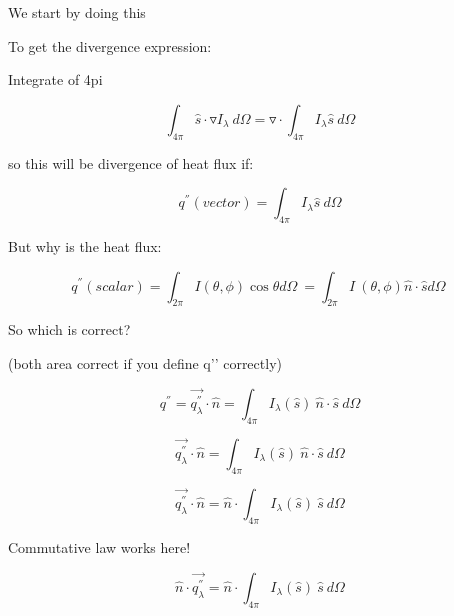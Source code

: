 \documentclass[12pt]{article}
\renewcommand{\_}{\kern-1.5pt\textunderscore\kern-1.5pt}
\begin{document}
We start by doing this\par

\par

To get the divergence expression:\par

\par

Integrate of 4pi\par

 \[  \int _{4 \pi }^{}\hat{s} \cdot \triangledown I_{ \lambda }~d \Omega =\triangledown  \cdot  \int _{4 \pi }^{}I_{ \lambda }\hat{s}~d \Omega  \] \par


\vspace{\baselineskip}
so this will be divergence of heat flux if:\par

 \[ q^{''} \left( vector \right) = \int _{4 \pi }^{}I_{ \lambda }\hat{s}~d \Omega  \] \par

But why is the heat flux:\par

 \[ q^{''} \left( scalar \right) = \int _{2 \pi }^{}I  \left(  \theta , \phi  \right)  \cos  \theta d \Omega ~= \int _{2 \pi }^{}I~ \left(  \theta , \phi  \right) \hat{n} \cdot \hat{s}d \Omega ~ \] \par

So which is correct?\par

(both area correct if you define q’’ correctly)\par

 \[ q^{''}=\overrightarrow{q_{ \lambda }^{''}} \cdot \hat{n}= \int _{4 \pi }^{}I_{ \lambda } \left( \hat{s} \right) ~\hat{n} \cdot \hat{s}~d \Omega  \] \par

 \[ \overrightarrow{q_{ \lambda }^{''}} \cdot \hat{n}= \int _{4 \pi }^{}I_{ \lambda } \left( \hat{s} \right) ~\hat{n} \cdot \hat{s}~d \Omega  \] \par

 \[ \overrightarrow{q_{ \lambda }^{''}} \cdot \hat{n}=\hat{n} \cdot  \int _{4 \pi }^{}I_{ \lambda } \left( \hat{s} \right) ~\hat{s}~d \Omega  \] \par

Commutative law works here!\par

 \[ \hat{n} \cdot \overrightarrow{q_{ \lambda }^{''}}=\hat{n} \cdot  \int _{4 \pi }^{}I_{ \lambda } \left( \hat{s} \right) ~\hat{s}~d \Omega  \] \par
\end{document}
